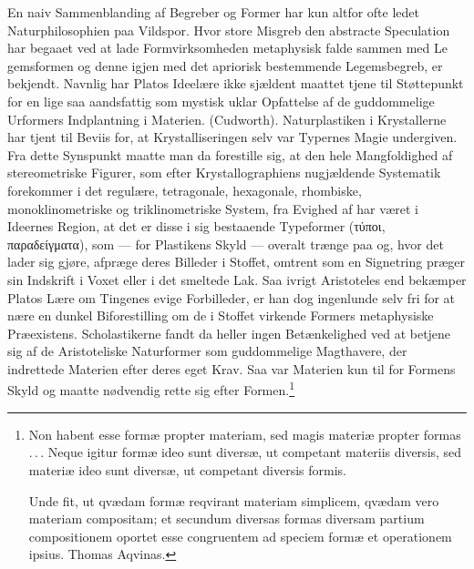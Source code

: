 \documentclass[12pt,a4paper]{book}
\begin{document}
En naiv Sammenblanding af Begreber og Former har kun altfor ofte ledet
Naturphilosophien paa Vildspor. Hvor store Misgreb den abstracte
Speculation har begaaet ved at lade Formvirksomheden metaphysisk falde
sammen med Le\-%
gemsformen og denne igjen med det apriorisk bestemmende Legemsbegreb, er
bekjendt. Navnlig har Platos Ideelære ikke sjældent maattet tjene til
Støttepunkt for en lige saa aandsfattig som mystisk uklar Opfattelse af
de guddommelige Urformers Indplantning i Materien. (Cudworth).
Naturplastiken i Krystallerne har tjent til Beviis for, at
Krystalliseringen selv var Typernes Magie undergiven. Fra dette
Synspunkt maatte man da forestille sig, at den hele Mangfoldighed af
stereometriske Figurer, som efter Krystallographiens nugjældende
Systematik forekommer i det regulære, tetragonale, hexagonale,
rhombiske, monoklinometriske og triklinometriske System, fra Evighed af
har været i Ideernes Region, at det er disse i sig bestaaende Typeformer
(τύποι, παραδείγματα), som --- for Plastikens Skyld --- overalt trænge
paa og, hvor det lader sig gjøre, afpræge deres Billeder i Stoffet,
omtrent som en Signetring præger sin Indskrift i Voxet eller i det
smeltede Lak. Saa ivrigt Aristoteles end bekæmper Platos Lære om
Tingenes evige Forbilleder, er han dog ingenlunde selv fri for at nære
en dunkel Biforestilling om de i Stoffet virkende Formers metaphysiske
Præexistens. Scholastikerne fandt da heller ingen Betænkelighed ved at
betjene sig af de Aristoteliske Naturformer som guddommelige
Magthavere, der indrettede Materien efter deres eget Krav. Saa var
Materien kun til for Formens Skyld og maatte nødvendig rette sig efter
Formen.\footnote{%
Non habent esse formæ propter materiam, sed magis materiæ propter
formas .\,.\,. Neque igitur formæ ideo sunt diversæ, ut competant
materiis diversis, sed materiæ ideo sunt diversæ, ut competant diversis
formis.\par
Unde fit, ut qvædam formæ reqvirant materiam simplicem, qvædam vero
materiam compositam; et secundum diversas formas diversam partium
compositionem oportet esse congruentem ad speciem formæ et operationem
ipsius. Thomas Aqvinas.}
\end{document}
